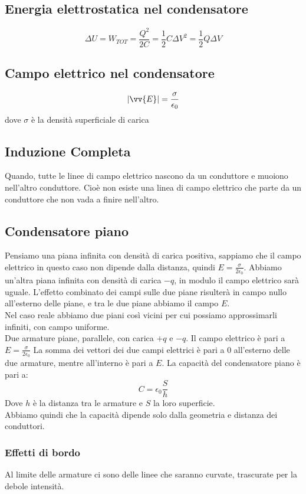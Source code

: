 \documentclass[a4paper]{report}
\begin{document}
  \subsection{Energia elettrostatica nel condensatore}
  $$ \Delta U = W_{TOT} = \frac{Q^2}{2C} = \frac{1}{2} C \Delta V^2 = \frac{1}{2} Q \Delta V $$

  \subsection{Campo elettrico nel condensatore}
  $$ |\vv{E}| = \frac{\sigma}{\epsilon_0} $$
  dove $\sigma$ è la densità superficiale di carica

  \subsection{Induzione Completa}
  Quando, tutte le linee di campo elettrico nascono da un conduttore e muoiono nell'altro conduttore. Cioè non esiste una linea di campo elettrico che parte da un conduttore che non vada a finire nell'altro.

  \subsection{Condensatore piano}
  Pensiamo una piana infinita con densità di carica positiva, sappiamo che il campo elettrico in questo caso non dipende dalla distanza, quindi $E= \frac{\sigma}{2\epsilon_0}$. Abbiamo un'altra piana infinita con densità di carica $-q$, in modulo il campo elettrico sarà uguale.
  L'effetto combinato dei campi sulle due piane risulterà in campo nullo all'esterno delle piane, e tra le due piane abbiamo il campo $E$.\\
  Nel caso reale abbiamo due piani così vicini per cui possiamo approssimarli infiniti, con campo uniforme.\\
  Due armature piane, parallele, con carica $+q$ e $-q$.
  Il campo elettrico è pari a \( E = \frac{\sigma}{2\epsilon_0} \)
  La somma dei vettori dei due campi elettrici è pari a $0$ all'esterno delle due armature, mentre all'interno è pari a $E$. La capacità del condensatore piano è pari a:
  $$ C = \epsilon_0 \frac{S}{h} $$
  Dove $h$ è la distanza tra le armature e $S$ la loro superficie.\\
  Abbiamo quindi che la capacità dipende solo dalla geometria e distanza dei conduttori.

  \subsubsection{Effetti di bordo}
  Al limite delle armature ci sono delle linee che saranno curvate, trascurate per la debole intensità.
\end{document}
